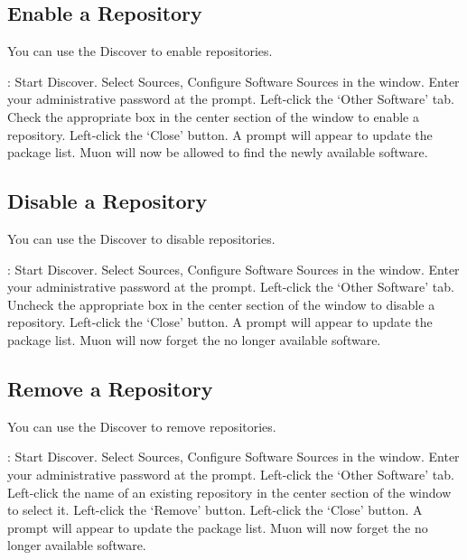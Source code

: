 \documentclass[letterpaper,10pt,english]{sphinxmanual}
\begin{document}



\subsection{Enable a Repository}
\label{\detokenize{docs/repositories:enable-a-repository}}
You can use the Discover to enable repositories.

: Start Discover. Select Sources, Configure Software Sources in the window. Enter your administrative password at the prompt. Left-click the `Other Software' tab. Check the appropriate box in the center section of the window to enable a repository. Left-click the `Close' button. A prompt will appear to update the package list. Muon will now be allowed to find the newly available software.


\subsection{Disable a Repository}
\label{\detokenize{docs/repositories:disable-a-repository}}
You can use the Discover to disable repositories.

: Start Discover. Select Sources, Configure Software Sources in the window. Enter your administrative password at the prompt. Left-click the `Other Software' tab. Uncheck the appropriate box in the center section of the window to disable a repository. Left-click the `Close' button. A prompt will appear to update the package list. Muon will now forget the no longer available software.


\subsection{Remove a Repository}
\label{\detokenize{docs/repositories:remove-a-repository}}
You can use the Discover to remove repositories.

: Start Discover. Select Sources, Configure Software Sources in the window. Enter your administrative password at the prompt. Left-click the `Other Software' tab. Left-click the name of an existing repository in the center section of the window to select it. Left-click the `Remove' button. Left-click the `Close' button. A prompt will appear to update the package list. Muon will now forget the no longer available software.
\end{document}
